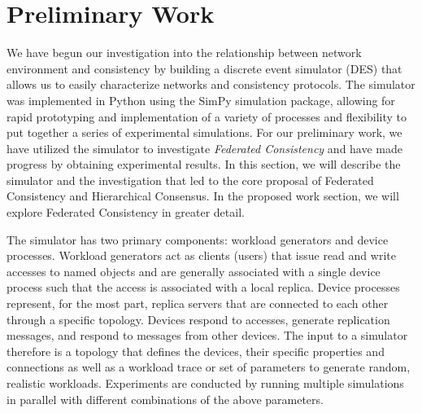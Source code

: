\documentclass{article}
\begin{document}
\section{Preliminary Work}
\label{sec:preliminary_work}

We have begun our investigation into the relationship between network environment and consistency by building a discrete event simulator (DES) that allows us to easily characterize networks and consistency protocols. The simulator was implemented in Python using the SimPy simulation package, allowing for rapid prototyping and implementation of a variety of processes and flexibility to put together a series of experimental simulations. For our preliminary work, we have utilized the simulator to investigate \textit{Federated Consistency} and have made progress by obtaining experimental results. In this section, we will describe the simulator and the investigation that led to the core proposal of Federated Consistency and Hierarchical Consensus. In the proposed work section, we will explore Federated Consistency in greater detail.

The simulator has two primary components: workload generators and device processes. Workload generators act as clients (users) that issue read and write accesses to named objects and are generally associated with a single device process such that the access is associated with a local replica. Device processes represent, for the most part, replica servers that are connected to each other through a specific topology. Devices respond to accesses, generate replication messages, and respond to messages from other devices. The input to a simulator therefore is a topology that defines the devices, their specific properties and connections as well as a workload trace or set of parameters to generate random, realistic workloads. Experiments are conducted by running multiple simulations in parallel with different combinations of the above parameters.
\end{document}

